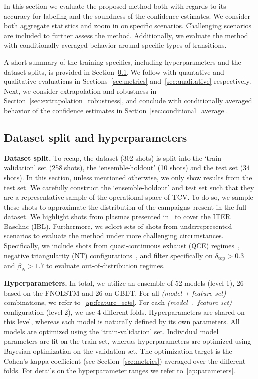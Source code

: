



In this section we evaluate the proposed method both with regards to its accuracy for labeling and the soundness of the confidence estimates. We consider both aggregate statistics and zoom in on specific scenarios. Challenging scenarios are included to further assess the method. Additionally, we evaluate the method with conditionally averaged behavior around specific types of transitions.

A short summary of the training specifics, including hyperparameters and the dataset splits, is provided in Section~\ref{sec:hyperparam}. We follow with quantative and qualitative evaluations in Sections~\ref{sec:metrics} and~\ref{sec:qualitative} respectively. Next, we consider extrapolation and robustness in Section~\ref{sec:extrapolation_robustness}, and conclude with conditionally averaged behavior of the confidence estimates in Section~\ref{sec:conditional_average}.

\subsection{Dataset split and hyperparameters}\label{sec:hyperparam}
\textbf{Dataset split.} To recap, the dataset (302 shots) is split into the `train-validation' set (258 shots), the `ensemble-holdout' (10 shots) and the test set (34 shots). In this section, unless mentioned otherwise, we only show results from the test set. We carefully construct the `ensemble-holdout' and test set such that they are a representative sample of the operational space of TCV. To do so, we sample these shots to approximate the distribution of the campaigns present in the full dataset. We highlight shots from plasmas presented in~\cite{labit2024} to cover the ITER Baseline (IBL). Furthermore, we select sets of shots from underrepresented scenarios to evaluate the method under more challenging circumstances. Specifically, we include shots from quasi-continuous exhaust (QCE) regimes~\cite{labit2019}, negative triangularity (NT) configurations~\cite{coda2022}, and filter specifically on $\delta_{\text{top}} > 0.3$ and $\beta_N > 1.7$ to evaluate out-of-distribution regimes.

\textbf{Hyperparameters.} In total, we utilize an ensemble of 52 models (level 1), 26 based on the FNOLSTM and 26 on GBDT. For all \textit{(model + feature set)} combinations, we refer to~\ref{ap:feature_sets}. For each \textit{(model + feature set)} configuration (level 2), we use 4 different folds. Hyperparameters are shared on this level, whereas each model is naturally defined by its own parameters. All models are optimized using the `train-validation' set. Individual model parameters are fit on the train set, whereas hyperparameters are optimized using Bayesian optimization on the validation set. The optimization target is the Cohen's kappa coefficient (see Section~\ref{sec:metrics}) averaged over the different folds. For details on the hyperparameter ranges we refer to~\ref{ap:parameters}.

